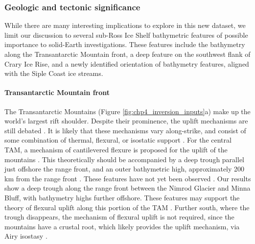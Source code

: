 



\subsubsection{Geologic and tectonic significance}

While there are many interesting implications to explore in this new dataset, we limit our discussion to several sub-Ross Ice Shelf bathymetric features of possible importance to solid-Earth investigations. These features include the bathymetry along the Transantarctic Mountain front, a deep feature on the southwest flank of Crary Ice Rise, and a newly identified orientation of bathymetry features, aligned with the Siple Coast ice streams. 

\paragraph*{Transantarctic Mountain front}

The Transantarctic Mountains (Figure \ref{fig:chp4_inversion_inputs}a) make up the world's largest rift shoulder. Despite their prominence, the uplift mechanisms are still debated \citep{goodgegeological2020}. It is likely that these mechanisms vary along-strike, and consist of some combination of thermal, flexural, or isostatic support \citep{goodgegeological2020}. For the central TAM, a mechanism of cantilevered flexure is proposed for the uplift of the mountains \citep{wannamakeruplift2017, yamasakinumerical2008}. This theoretically should be accompanied by a deep trough parallel just offshore the range front, and an outer bathymetric high, approximately 200 km from the range front \citep{sternflexural1989}. These features have not yet been observed \citep{tenbrinkgeophysical1993, wannamakeruplift2017}. Our results show a deep trough along the range front between the Nimrod Glacier and Minna Bluff, with bathymetry highs further offshore. These features may support the theory of flexural uplift along this portion of the TAM \citep{wannamakeruplift2017}. Further south, where the trough disappears, the mechanism of flexural uplift is not required, since the mountains have a crustal root, which likely provides the uplift mechanism, via Airy isostasy \citep{blockantarctic2009, wannamakeruplift2017}. 

